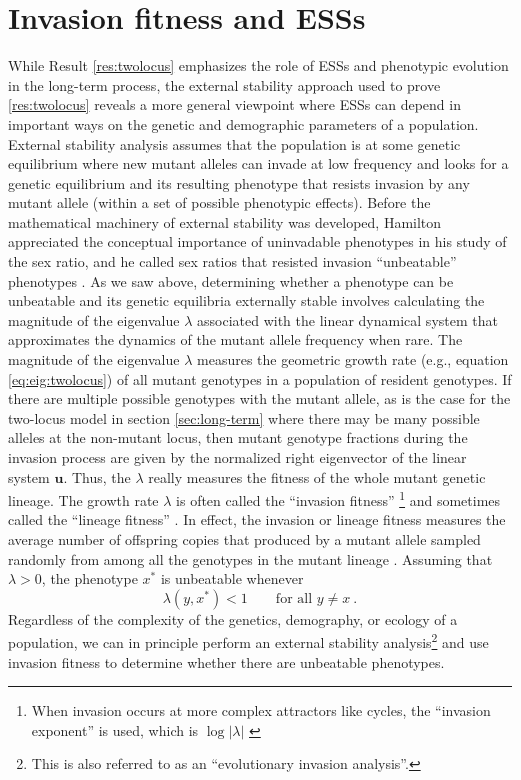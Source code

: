 \documentclass[11pt]{article}
\newcommand{\ess}[1]{#1^*}
\renewcommand{\vec}[1]{\symbf{#1}}
\newcommand{\eig}{\lambda}
\begin{document}
\section{Invasion fitness and ESSs}

While Result \ref{res:twolocus} emphasizes the role of ESSs and phenotypic evolution in the long-term process, the external stability approach used to prove \ref{res:twolocus} reveals a more general viewpoint where ESSs can depend in important ways on the genetic and demographic parameters of a population. External stability analysis assumes that the population is at some genetic equilibrium where new mutant alleles can invade at low frequency and looks for a genetic equilibrium and its resulting phenotype that resists invasion by any mutant allele (within a set of possible phenotypic effects). Before the mathematical machinery of external stability was developed, Hamilton appreciated the conceptual importance of uninvadable phenotypes in his study of the sex ratio, and he called sex ratios that resisted invasion ``unbeatable'' phenotypes \cite{Hamilton:1967}. As we saw above, determining whether a phenotype can be unbeatable and its genetic equilibria externally stable involves calculating the magnitude of the eigenvalue $\eig$ associated with the linear dynamical system that approximates the dynamics of the mutant allele frequency when rare. The magnitude of the eigenvalue $\eig$ measures the geometric growth rate (e.g., equation \eqref{eq:eig:twolocus}) of all mutant genotypes in a population of resident genotypes. If there are multiple possible genotypes with the mutant allele, as is the case for the two-locus model in section \ref{sec:long-term} where there may be many possible alleles at the non-mutant locus, then mutant genotype fractions during the invasion process are given by the normalized right eigenvector of the linear system $\vec{u}$. Thus, the $\eig$ really measures the fitness of the whole mutant genetic lineage. The growth rate $\eig$ is often called the ``invasion fitness'' \cite{Metz:Nisbet:1992,Heino:Metz:1998}\footnote{When invasion occurs at more complex attractors like cycles, the ``invasion exponent'' is used, which is $\log |\eig|$ \cite{Rand:Wilson:1994}} and sometimes called the ``lineage fitness'' \cite{Lehmann:Alger:2015,Akcay:VanCleve:2016,Lehmann:Mullon:2016,Lehmann:Rousset:2020}. In effect, the invasion or lineage fitness measures the average number of offspring copies that produced by a mutant allele sampled randomly from among all the genotypes in the mutant lineage \cite{Lehmann:Mullon:2016}. Assuming that $\eig >0$, the phenotype $\ess{x}$ is unbeatable whenever
\begin{equation}
  \label{eq:unbeatable}
  \eig(y, \ess{x}) < 1 \qquad \text{for all } y \ne x \: .
\end{equation}
Regardless of the complexity of the genetics, demography, or ecology of a population, we can in principle perform an external stability analysis\footnote{This is also referred to as an ``evolutionary invasion analysis''.} and use invasion fitness to determine whether there are unbeatable phenotypes.
\end{document}
